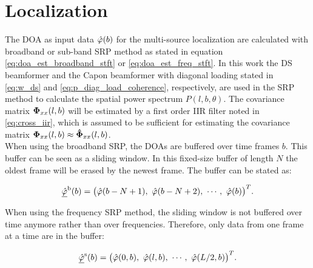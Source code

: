 
\section{Localization}
\label{sec:alg_localization}
The \ac{DOA} as input data $\hat{\varphi}(b)$ for the multi-source localization are calculated with broadband or sub-band \ac{SRP} method as stated in equation \ref{eq:doa_est_broadband_stft} or \ref{eq:doa_est_freq_stft}.
In this work the \ac{DS} beamformer and the Capon beamformer with diagonal loading stated in \ref{eq:w_ds} and \ref{eq:p_diag_load_coherence}, respectively, are used in the \ac{SRP} method to calculate the spatial power spectrum $P(l,b,\theta)$.
The covariance matrix $\mathbf{\Phi}_{xx}(l,b)$ will be estimated by a first order \ac{IIR} filter noted in \ref{eq:cross_iir}, which is assumed to be sufficient for estimating the covariance matrix $\mathbf{\Phi}_{xx}(l,b) \approx  \mathbf{\hat{\Phi}}_{xx}(l,b)$.\\
When using the broadband \ac{SRP}, the \acp{DOA} are buffered over time frames $b$. This buffer can be seen as a sliding window. In this fixed-size buffer of length $N$ the oldest frame will be erased by the newest frame. The buffer can be stated as:

\begin{equation}
\underline{\hat{\varphi}}^\text{b}(b) = \big(\hat{\varphi}(b-N+1),\ \hat{\varphi}(b-N+2),\ \cdots,\ \hat{\varphi}(b) \big)^T.
\label{doa_buffer_broad}
\end{equation}

When using the frequency \ac{SRP} method, the sliding window is not buffered over time anymore rather than over frequencies. Therefore, only data from one frame at a time are in the buffer:

\begin{equation}
\underline{\hat{\varphi}}^\text{s}(b) = \big(\hat{\varphi}(0,b),\ \hat{\varphi}(l,b),\ \cdots,\ \hat{\varphi}(L/2,b) \big)^T.
\label{doa_buffer_sub}
 \end{equation}

